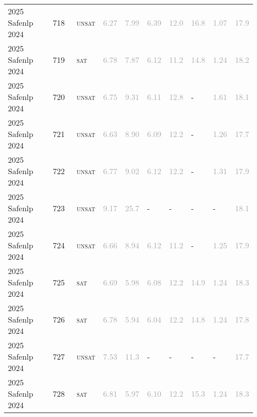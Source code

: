 \begin{center}
{\begin{longtable}{@{}llllllllll@{}}
2025 Safenlp 2024 & 718 & ~\textsc{unsat} & \textcolor{darkgray}{6.27} & \textcolor{darkgray}{7.99} & \textcolor{darkgray}{6.39} & \textcolor{darkgray}{12.0} & \textcolor{darkgray}{16.8} & \textcolor{darkgray}{1.07} & \textcolor{darkgray}{17.9} \\
2025 Safenlp 2024 & 719 & ~\textsc{sat} & \textcolor{darkgray}{6.78} & \textcolor{darkgray}{7.87} & \textcolor{darkgray}{6.12} & \textcolor{darkgray}{11.2} & \textcolor{darkgray}{14.8} & \textcolor{darkgray}{1.24} & \textcolor{darkgray}{18.2} \\
2025 Safenlp 2024 & 720 & ~\textsc{unsat} & \textcolor{darkgray}{6.75} & \textcolor{darkgray}{9.31} & \textcolor{darkgray}{6.11} & \textcolor{darkgray}{12.8} & - & \textcolor{darkgray}{1.61} & \textcolor{darkgray}{18.1} \\
2025 Safenlp 2024 & 721 & ~\textsc{unsat} & \textcolor{darkgray}{6.63} & \textcolor{darkgray}{8.90} & \textcolor{darkgray}{6.09} & \textcolor{darkgray}{12.2} & - & \textcolor{darkgray}{1.26} & \textcolor{darkgray}{17.7} \\
2025 Safenlp 2024 & 722 & ~\textsc{unsat} & \textcolor{darkgray}{6.77} & \textcolor{darkgray}{9.02} & \textcolor{darkgray}{6.12} & \textcolor{darkgray}{12.2} & - & \textcolor{darkgray}{1.31} & \textcolor{darkgray}{17.9} \\
2025 Safenlp 2024 & 723 & ~\textsc{unsat} & \textcolor{darkgray}{9.17} & \textcolor{darkgray}{25.7} & - & - & - & - & \textcolor{darkgray}{18.1} \\
2025 Safenlp 2024 & 724 & ~\textsc{unsat} & \textcolor{darkgray}{6.66} & \textcolor{darkgray}{8.94} & \textcolor{darkgray}{6.12} & \textcolor{darkgray}{11.2} & - & \textcolor{darkgray}{1.25} & \textcolor{darkgray}{17.9} \\
2025 Safenlp 2024 & 725 & ~\textsc{sat} & \textcolor{darkgray}{6.69} & \textcolor{darkgray}{5.98} & \textcolor{darkgray}{6.08} & \textcolor{darkgray}{12.2} & \textcolor{darkgray}{14.9} & \textcolor{darkgray}{1.24} & \textcolor{darkgray}{18.3} \\
2025 Safenlp 2024 & 726 & ~\textsc{sat} & \textcolor{darkgray}{6.78} & \textcolor{darkgray}{5.94} & \textcolor{darkgray}{6.04} & \textcolor{darkgray}{12.2} & \textcolor{darkgray}{14.8} & \textcolor{darkgray}{1.24} & \textcolor{darkgray}{17.8} \\
2025 Safenlp 2024 & 727 & ~\textsc{unsat} & \textcolor{darkgray}{7.53} & \textcolor{darkgray}{11.3} & - & - & - & - & \textcolor{darkgray}{17.7} \\
2025 Safenlp 2024 & 728 & ~\textsc{sat} & \textcolor{darkgray}{6.81} & \textcolor{darkgray}{5.97} & \textcolor{darkgray}{6.10} & \textcolor{darkgray}{12.2} & \textcolor{darkgray}{15.3} & \textcolor{darkgray}{1.24} & \textcolor{darkgray}{18.3} \\

\end{longtable}}
\end{center}
